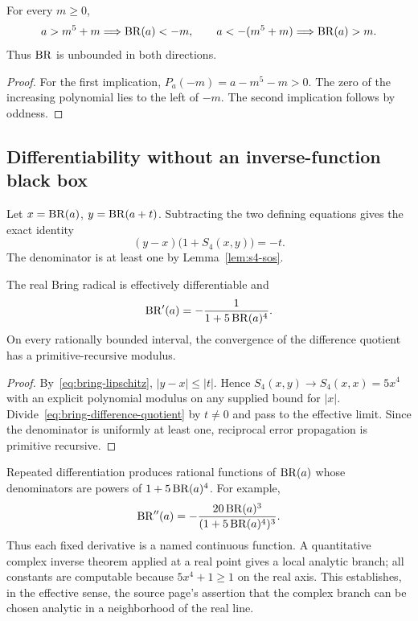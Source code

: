\begin{corollary}\label{cor:bring-unbounded}
For every \(m\ge0\),
\[
 a>m^5+m\Longrightarrow \operatorname{BR}(a)<-m,
 \qquad
 a<-(m^5+m)\Longrightarrow \operatorname{BR}(a)>m.
\]
Thus \(\operatorname{BR}\) is unbounded in both directions.
\end{corollary}

\begin{proof}
For the first implication,
\(P_a(-m)=a-m^5-m>0\).  The zero of the increasing polynomial lies to the
left of \(-m\).  The second implication follows by oddness.
\end{proof}

\subsection{Differentiability without an inverse-function black box}

Let \(x=\operatorname{BR}(a)\), \(y=\operatorname{BR}(a+t)\).  Subtracting the two defining equations gives
the exact identity
\begin{equation}\label{eq:bring-difference-quotient}
 (y-x)\bigl(1+S_4(x,y)\bigr)=-t.
\end{equation}
The denominator is at least one by Lemma~\ref{lem:s4-sos}.

\begin{theorem}\label{thm:bring-derivative}
The real Bring radical is effectively differentiable and
\begin{equation}\label{eq:bring-derivative}
 \operatorname{BR}'(a)=-\frac{1}{1+5\operatorname{BR}(a)^4}.
\end{equation}
On every rationally bounded interval, the convergence of the difference
quotient has a primitive-recursive modulus.
\end{theorem}

\begin{proof}
By~\eqref{eq:bring-lipschitz}, \(|y-x|\le|t|\).  Hence
\(S_4(x,y)\to S_4(x,x)=5x^4\) with an explicit polynomial modulus on any
supplied bound for \(|x|\).  Divide~\eqref{eq:bring-difference-quotient} by
\(t\ne0\) and pass to the effective limit.  Since the denominator is uniformly
at least one, reciprocal error propagation is primitive recursive.
\end{proof}

Repeated differentiation produces rational functions of \(\operatorname{BR}(a)\) whose
denominators are powers of \(1+5\operatorname{BR}(a)^4\).  For example,
\[
 \operatorname{BR}''(a)=-\frac{20\operatorname{BR}(a)^3}{(1+5\operatorname{BR}(a)^4)^3}.
\]
Thus each fixed derivative is a named continuous function.  A quantitative
complex inverse theorem applied at a real point gives a local analytic branch;
all constants are computable because \(5x^4+1\ge1\) on the real axis.  This
establishes, in the effective sense, the source page's assertion that the
complex branch can be chosen analytic in a neighborhood of the real line.

